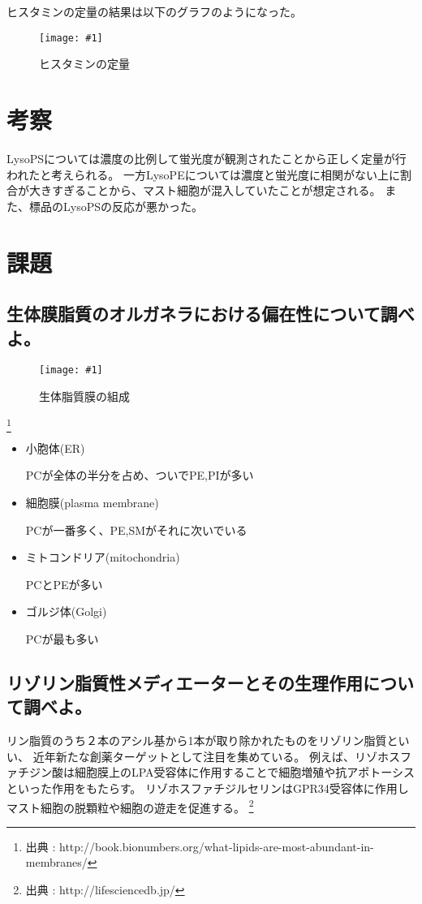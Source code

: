 \documentclass[a4paper,papersize,dvipdfmx]{jsarticle}
\newcommand{\piccap}[3]{\begin{figure}[H] \centering \texttt{[image: \#1]} \caption{#3} \label{fig {#1}} \end{figure}} %
\begin{document}
ヒスタミンの定量の結果は以下のグラフのようになった。
\piccap{images/bars.png}{7}{ヒスタミンの定量}


\section*{考察}
LysoPSについては濃度の比例して蛍光度が観測されたことから正しく定量が行われたと考えられる。
一方LysoPEについては濃度と蛍光度に相関がない上に割合が大きすぎることから、マスト細胞が混入していたことが想定される。
また、標品のLysoPSの反応が悪かった。

\section*{課題}

\subsection*{生体膜脂質のオルガネラにおける偏在性について調べよ。}
\piccap{images/organella.png}{8}{生体脂質膜の組成}
\footnote{
出典 : http://book.bionumbers.org/what-lipids-are-most-abundant-in-membranes/
}
\begin{itemize}
\item 小胞体(ER)

PCが全体の半分を占め、ついでPE,PIが多い

\item 細胞膜(plasma membrane)

PCが一番多く、PE,SMがそれに次いでいる

\item ミトコンドリア(mitochondria)

PCとPEが多い

\item ゴルジ体(Golgi)

PCが最も多い
\end{itemize}

\subsection*{リゾリン脂質性メディエーターとその生理作用について調べよ。}
リン脂質のうち２本のアシル基から1本が取り除かれたものをリゾリン脂質といい、
近年新たな創薬ターゲットとして注目を集めている。
例えば、リゾホスファチジン酸は細胞膜上のLPA受容体に作用することで細胞増殖や抗アポトーシスといった作用をもたらす。
リゾホスファチジルセリンはGPR34受容体に作用しマスト細胞の脱顆粒や細胞の遊走を促進する。
\footnote{
出典 : http://lifesciencedb.jp/
}
\end{document}
